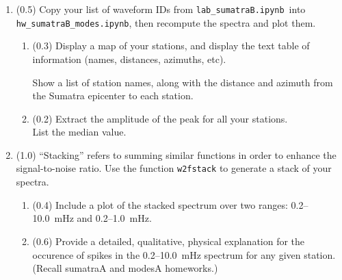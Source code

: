 \documentclass[11pt,titlepage,fleqn]{article}
\newcommand{\tfilemodes}{{\tt hw\_sumatraB\_modes.ipynb}}
\newcommand{\tfilelab}{{\tt lab\_sumatraB.ipynb}}
\begin{document}
\begin{enumerate}

\item (0.5) Copy your list of waveform IDs from \tfilelab\ into \tfilemodes, then recompute the spectra and plot them.
%
\begin{enumerate}
\item (0.3) %
Display a map of your stations, and display the text table of information (names, distances, azimuths, etc).

Show a list of station names, along with the distance and azimuth from the Sumatra epicenter to each station.

\item (0.2) Extract the amplitude of the  peak for all your stations. \\
List the median value.
\end{enumerate}


\item (1.0) ``Stacking'' refers to summing similar functions in order to enhance the signal-to-noise ratio. Use the function \verb+w2fstack+ to generate a stack of your spectra.
%
\begin{enumerate}
\item (0.4) Include a plot of the stacked spectrum over two ranges: 0.2--10.0~mHz and 0.2--1.0~mHz.
\item (0.6) Provide a detailed, qualitative, physical explanation for the occurence of spikes in the 0.2--10.0~mHz spectrum for any given station. (Recall sumatraA and modesA homeworks.)
\end{enumerate}
%



\end{enumerate}
\end{document}
